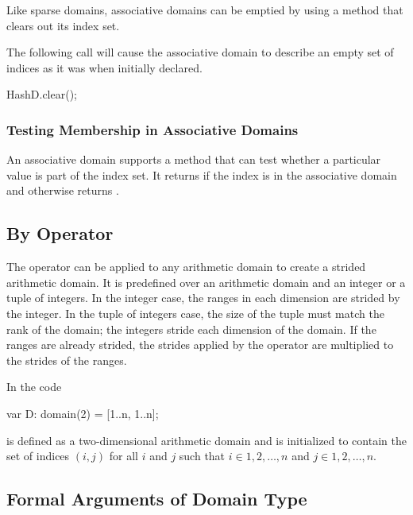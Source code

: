 Like sparse domains, associative domains can be emptied by using a
method  that clears out its index set.

\begin{example}
The following call will cause the associative domain  to
describe an empty set of indices as it was when initially declared.
\begin{chapel}
HashD.clear();
\end{chapel}
\end{example}

\subsubsection{Testing Membership in Associative Domains}

An associative domain supports a  method that can test
whether a particular value is part of the index set. It
returns  if the index is in the associative domain and
otherwise returns .


\subsection{By Operator}
\label{By_Operator_For_Domains}

The  operator can be applied to any arithmetic domain to
create a strided arithmetic domain.  It is predefined over an
arithmetic domain and an integer or a tuple of integers.  In the
integer case, the ranges in each dimension are strided by the integer.
In the tuple of integers case, the size of the tuple must match the
rank of the domain; the integers stride each dimension of the domain.
If the ranges are already strided, the strides applied by
the  operator are multiplied to the strides of the ranges.


\begin{example}
In the code
\begin{chapel}
var D: domain(2) = [1..n, 1..n];
\end{chapel}
 is defined as a two-dimensional arithmetic domain and is
initialized to contain the set of indices $(i,j)$ for all $i$ and $j$
such that $i \in {1, 2, \ldots, n}$ and $j \in {1, 2, \ldots, n}$.
\end{example}


\subsection{Formal Arguments of Domain Type}
\label{Formal_Arguments_of_Domain_Type}

